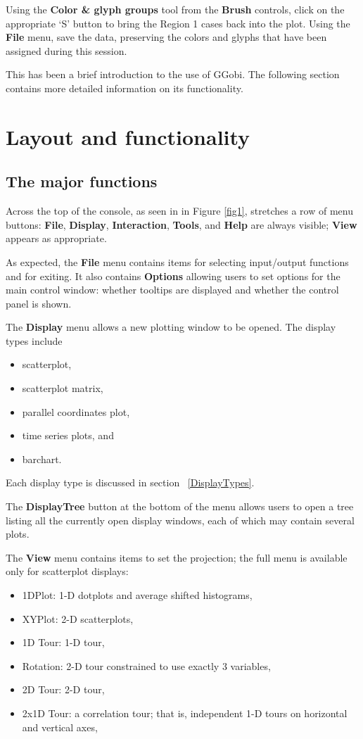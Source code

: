 \documentclass[11pt]{article}
\def\Widget#1{\textbf{#1}}
\begin{document}
Using the \Widget{Color \& glyph groups} tool from the \Widget{Brush}
controls, click on the appropriate `S' button to bring the Region 1
cases back into the plot.  Using the \Widget{File} menu, save the data,
preserving the colors and glyphs that have been assigned during this
session.

This has been a brief introduction to the use of GGobi. The following
section contains more detailed information on its functionality.

\section{Layout and functionality}

\subsection{The major functions}

Across the top of the console, as seen in in Figure \ref{fig1},
stretches a row of menu buttons: \Widget{File}, \Widget{Display},
\Widget{Interaction}, \Widget{Tools}, and \Widget{Help} are always visible;
\Widget{View} appears as appropriate.

As expected, the \Widget{File} menu contains items for selecting
input/output functions and for exiting.  It also contains
\Widget{Options} allowing users to set options for the main control
window: whether tooltips are displayed and whether the control panel
is shown.

The \Widget{Display} menu allows a new plotting window to be opened. 
The display types include
\begin{itemize}
\itemsep 0em
\item scatterplot,
\item scatterplot matrix, 
\item parallel coordinates plot, 
\item time series plots, and
\item barchart.
\end{itemize}

Each display type
is discussed in section ~\ref{DisplayTypes}.

The \Widget{DisplayTree} button at the bottom of the menu allows users to
open a tree listing all the currently open display windows, each of
which may contain several plots.

The \Widget{View} menu contains items to set the projection; the
full menu is available only for scatterplot displays:
\begin{itemize}
\itemsep 0em
\item 1DPlot: 1-D dotplots and average shifted histograms,
\item XYPlot: 2-D scatterplots,
\item 1D Tour: 1-D tour,
\item Rotation: 2-D tour constrained to use exactly 3 variables,
\item 2D Tour: 2-D tour,
\item 2x1D Tour: a correlation tour; that is, independent 1-D tours on
      horizontal and vertical axes,
\end{itemize}
\end{document}
